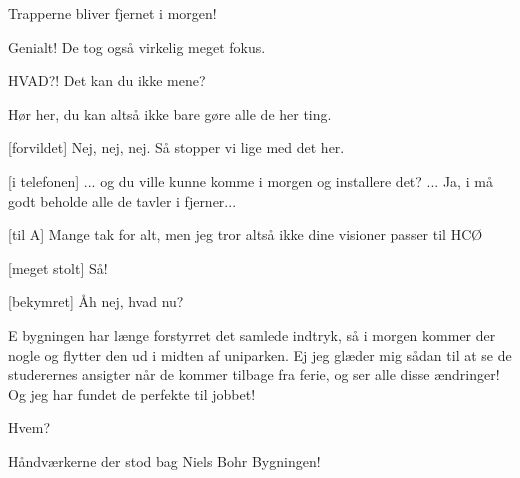 \documentclass[a4paper,11pt]{article}
\begin{document}
\begin{sketch}
 Trapperne bliver fjernet i morgen!


 Genialt! De tog også virkelig meget fokus.

 HVAD?! Det kan du ikke mene? 


 Hør her, du kan altså ikke bare gøre alle de her ting.


[forvildet] Nej, nej, nej. Så stopper vi lige med det her.

[i telefonen] ... og du ville kunne komme i morgen og installere det? ... Ja, i må godt beholde alle de tavler i fjerner...


[til A] Mange tak for alt, men jeg tror altså ikke dine visioner passer til HCØ


[meget stolt] Så!

[bekymret] Åh nej, hvad nu?


 E bygningen har længe forstyrret det samlede indtryk, så i morgen kommer der nogle og flytter den ud i midten af uniparken. Ej jeg glæder mig sådan til at se de studerernes ansigter når de kommer tilbage fra ferie, og ser alle disse ændringer! Og jeg har fundet de perfekte til jobbet!  

 Hvem?

 Håndværkerne der stod bag Niels Bohr Bygningen!

\end{sketch}
\end{document}
